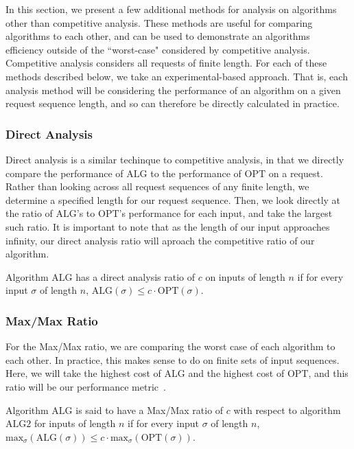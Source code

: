 In this section, we present a few additional methods for analysis on algorithms other than competitive analysis. These methods are useful for comparing algorithms to each other, and can be used to demonstrate an algorithms efficiency outside of the ``worst-case" considered by competitive analysis. Competitive analysis considers all requests of finite length. For each of these methods described below, we take an experimental-based approach. That is, each analysis method will be considering the performance of an algorithm on a given request sequence length, and so can therefore be directly calculated in practice.

\subsubsection*{Direct Analysis}
\label{sec:Direct}
Direct analysis is a similar techinque to competitive analysis, in that we directly compare the performance of $\mathrm{ALG}$ to the performance of $\mathrm{OPT}$ on a request. Rather than looking across all request sequences of any finite length, we determine a specified length for our request sequence. Then, we look directly at the ratio of $\mathrm{ALG}$'s to $\mathrm{OPT}$'s performance for each input, and take the largest such ratio. It is important to note that as the length of our input approaches infinity, our direct analysis ratio will aproach the competitive ratio of our algorithm.

\begin{definition}
    \label{def:direct}
    Algorithm $\mathrm{ALG}$ has a direct analysis ratio of $c$ on inputs of length $n$ if for every input $\sigma$ of length $n$, $\mathrm{ALG}(\sigma) \leq c\cdot \mathrm{OPT}(\sigma)$.
\end{definition}

\subsubsection*{Max/Max Ratio}
\label{sec:MaxMax}
For the Max/Max ratio, we are comparing the worst case of each algorithm to each other. In practice, this makes sense to do on finite sets of input sequences. Here, we will take the highest cost of $\mathrm{ALG}$ and the highest cost of $\mathrm{OPT}$, and this ratio will be our performance metric~\cite{MAXMAX2005}. 

\begin{definition}
    Algorithm $\mathrm{ALG}$ is said to have a Max/Max ratio of $c$ with respect to algorithm $\mathrm{ALG}2$ for inputs of length $n$ if for every input $\sigma$ of length $n$, $\mathrm{max}_{\sigma}(\mathrm{ALG}(\sigma)) \leq c\cdot \mathrm{max}_{\sigma}(\mathrm{OPT}(\sigma))$.
\end{definition}

